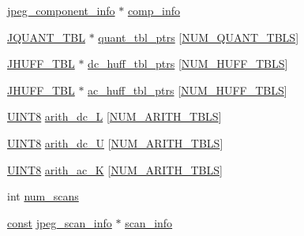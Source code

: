 \begin{DoxyCompactItemize}
\item 
\hyperlink{structjpeg__component__info}{jpeg\+\_\+component\+\_\+info} $\ast$ \hyperlink{structjpeg__compress__struct_a4d37d3f336cc11acafef541bf8ed38cc}{comp\+\_\+info}
\item 
\hyperlink{struct_j_q_u_a_n_t___t_b_l}{J\+Q\+U\+A\+N\+T\+\_\+\+T\+BL} $\ast$ \hyperlink{structjpeg__compress__struct_a70a194c6a9c1744e1ed3a97232fb97f5}{quant\+\_\+tbl\+\_\+ptrs} \mbox{[}\hyperlink{jpeglib_8h_ab3254a23612ea48615001fffc0c9f691}{N\+U\+M\+\_\+\+Q\+U\+A\+N\+T\+\_\+\+T\+B\+LS}\mbox{]}
\item 
\hyperlink{struct_j_h_u_f_f___t_b_l}{J\+H\+U\+F\+F\+\_\+\+T\+BL} $\ast$ \hyperlink{structjpeg__compress__struct_a6a69e90a68e1f7f46774d83ba3737a4e}{dc\+\_\+huff\+\_\+tbl\+\_\+ptrs} \mbox{[}\hyperlink{jpeglib_8h_a6b12985705944e0623b671f29dc5722e}{N\+U\+M\+\_\+\+H\+U\+F\+F\+\_\+\+T\+B\+LS}\mbox{]}
\item 
\hyperlink{struct_j_h_u_f_f___t_b_l}{J\+H\+U\+F\+F\+\_\+\+T\+BL} $\ast$ \hyperlink{structjpeg__compress__struct_a98d33cae3c8eee8f1f8d662e31cb905d}{ac\+\_\+huff\+\_\+tbl\+\_\+ptrs} \mbox{[}\hyperlink{jpeglib_8h_a6b12985705944e0623b671f29dc5722e}{N\+U\+M\+\_\+\+H\+U\+F\+F\+\_\+\+T\+B\+LS}\mbox{]}
\item 
\hyperlink{jmorecfg_8h_adfb9a8ea1dd59f151065f763e1e9acd6}{U\+I\+N\+T8} \hyperlink{structjpeg__compress__struct_a736d867907116e88b3b38422fb2688c5}{arith\+\_\+dc\+\_\+L} \mbox{[}\hyperlink{jpeglib_8h_a4efb0fccc8d9db72ca18f32a26fad6ab}{N\+U\+M\+\_\+\+A\+R\+I\+T\+H\+\_\+\+T\+B\+LS}\mbox{]}
\item 
\hyperlink{jmorecfg_8h_adfb9a8ea1dd59f151065f763e1e9acd6}{U\+I\+N\+T8} \hyperlink{structjpeg__compress__struct_a6ba30334643b7a5280343fe0e5e49e1e}{arith\+\_\+dc\+\_\+U} \mbox{[}\hyperlink{jpeglib_8h_a4efb0fccc8d9db72ca18f32a26fad6ab}{N\+U\+M\+\_\+\+A\+R\+I\+T\+H\+\_\+\+T\+B\+LS}\mbox{]}
\item 
\hyperlink{jmorecfg_8h_adfb9a8ea1dd59f151065f763e1e9acd6}{U\+I\+N\+T8} \hyperlink{structjpeg__compress__struct_ac1994386d3fa3ff139b63bf4bb4dcc36}{arith\+\_\+ac\+\_\+K} \mbox{[}\hyperlink{jpeglib_8h_a4efb0fccc8d9db72ca18f32a26fad6ab}{N\+U\+M\+\_\+\+A\+R\+I\+T\+H\+\_\+\+T\+B\+LS}\mbox{]}
\item 
int \hyperlink{structjpeg__compress__struct_abf2f96c340659a09a9ce08469a17e08b}{num\+\_\+scans}
\item 
\hyperlink{zconf_8h_a2c212835823e3c54a8ab6d95c652660e}{const} \hyperlink{structjpeg__scan__info}{jpeg\+\_\+scan\+\_\+info} $\ast$ \hyperlink{structjpeg__compress__struct_a545fed3fef0d0c5962dbe0e80c067c03}{scan\+\_\+info}

\end{DoxyCompactItemize}
